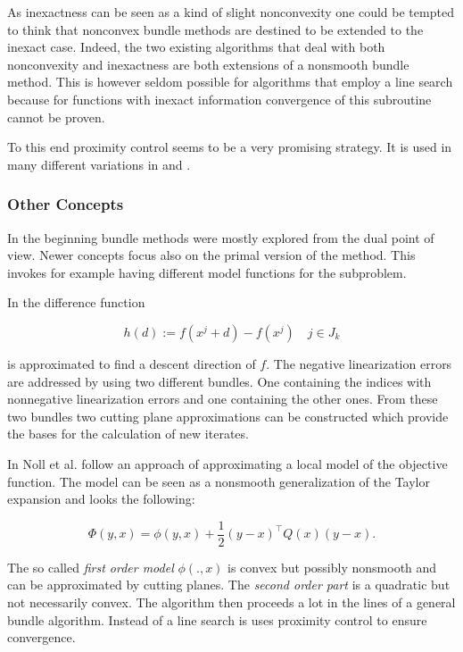 As inexactness can be seen as a kind of slight nonconvexity one could be tempted to think that nonconvex bundle methods are destined to be extended to the inexact case. Indeed, the two existing algorithms \cite{Hare2016,Noll2013} that deal with both nonconvexity and inexactness are both extensions of a nonsmooth bundle method.
This is however seldom possible for algorithms that employ a line search because for functions with inexact information convergence of this subroutine cannot be proven.

To this end proximity control seems to be a very promising strategy. It is used in many different variations in \cite{Apkarian2008, Lewis2015, Noll2010, Noll2005, Noll2012} and \cite{Schramm1992}.

\subsubsection{Other Concepts}

In the beginning bundle methods were mostly explored from the  dual point of view. Newer concepts focus also on the primal version of the method. This invokes for example having different model functions for the subproblem.

In \cite{Fuduli2004, Fuduli2004a} the difference function 

\begin{equation*}
	h(d):= f(x^j +d) -f(x^j) \quad j \in J_k
\label{diff_fun}
\end{equation*}

is approximated to find a descent direction of \(f\).
The negative linearization errors are addressed by using two different bundles. One containing the indices with nonnegative linearization errors and one containing the other ones. From these two bundles two cutting plane approximations can be constructed which provide the bases for the calculation of new iterates.

In \cite{Noll2012} Noll et al. follow an approach of approximating a local model of the objective function. The model can be seen as a nonsmooth generalization of the Taylor expansion and looks the following:

\begin{equation*}
	\Phi(y,x) = \phi(y,x)+\frac{1}{2}(y-x)^{\top}Q(x)(y-x).
\label{quad_mod}
\end{equation*}

The so called \emph{first order model} \(\phi(.,x)\) is convex but possibly nonsmooth and can be approximated by cutting planes. The \emph{second order part} is a quadratic but not necessarily convex. The algorithm then proceeds a lot in the lines of a general bundle algorithm.
Instead of a line search is uses proximity control to ensure convergence.

